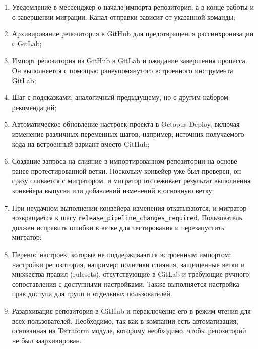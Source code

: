 \begin{enumerate}
  \item Уведомление в мессенджер о начале импорта репозитория, а в конце работы и о завершении миграции.
        Канал отправки зависит от указанной команды;
  \item Архивирование репозитория в GitHub для предотвращения рассинхронизации с GitLab;
  \item Импорт репозитория из GitHub в GitLab и ожидание завершения процесса.
        Он выполняется с помощью ранеупомянутого встроенного инструмента GitLab;
  \item Шаг с подсказками, аналогичный предыдущему, но с другим набором рекомендаций;
  \item Автоматическое обновление настроек проекта в Octopus Deploy, включая изменение различных переменных шагов, например, источник получаемого кода на встроенный вариант вместо GitHub;
  \item Создание запроса на слияние в импортированном репозитории на основе ранее протестированной ветки.
        Поскольку конвейер уже был проверен, он сразу сливается с мигратором, и мигратор отслеживает результат выполнения конвейера выпуска или добавлений изменений в основную ветку;
  \item При неудачном выполнении конвейера изменения откатываются, и мигратор возвращается к шагу \texttt{release\_pipeline\_changes\_required}.
        Пользователь должен исправить ошибки в ветке для тестирования и перезапустить мигратор;
  \item Перенос настроек, которые не поддерживаются встроенным импортом: настройки репозитория, например: политики слияния, защищенные ветки и множества правил (rulesets), отсутствующие в GitLab и требующие ручного сопоставления с доступными настройками.
        Также выполняется настройка прав доступа для групп и отдельных пользователей.
  \item Разархивация репозитория в GitHub и переключение его в режим чтения для всех пользователей.
        Необходимо, так как в компании есть автоматизация, основанная на Terraform модуле, которому необходимо, чтобы репозиторий не был заархивирован.
\end{enumerate}
